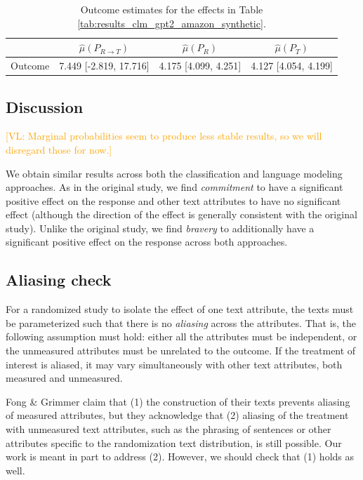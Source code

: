 \documentclass{article}
\newcommand{\vl}[1]{\textcolor{orange}{[VL: #1]}}
\begin{document}
\begin{table}[!ht]
\centering
\begin{tabular}{c|ccc}
\toprule
    & $\hat{\mu}(P_{R \rightarrow T})$   & $\hat{\mu}(P_R)$     & $\hat{\mu}(P_T)$     \\
\midrule
    Outcome & 7.449 [-2.819, 17.716]             & 4.175 [4.099, 4.251] & 4.127 [4.054, 4.199] \\
\bottomrule
\end{tabular}
\caption{Outcome estimates for the effects in Table \ref{tab:results_clm_gpt2_amazon_synthetic}.}
\label{tab:results_clm_gpt2_amazon_synthetic_outcome}
\end{table}

\newpage
\subsection{Discussion}

\vl{Marginal probabilities seem to produce less stable results, so we will disregard those for now.}

We obtain similar results across both the classification and language modeling approaches.  As in the original study, we find \textit{commitment} to have a significant positive effect on the response and other text attributes to have no significant effect (although the direction of the effect is generally consistent with the original study). Unlike the original study, we find \textit{bravery} to additionally have a significant positive effect on the response across both approaches.

\subsection{Aliasing check}

For a randomized study to isolate the effect of one text attribute, the texts must be parameterized such that there is no \textit{aliasing} across the attributes. That is, the following assumption must hold: either all the attributes must be independent, or the unmeasured attributes must be unrelated to the outcome. If the treatment of interest is aliased, it may vary simultaneously with other text attributes, both measured and unmeasured.

Fong \& Grimmer claim that (1) the construction of their texts prevents aliasing of measured attributes, but they acknowledge that (2) aliasing of the treatment with unmeasured text attributes, such as the phrasing of sentences or other attributes specific to the randomization text distribution, is still possible. Our work is meant in part to address (2). However, we should check that (1) holds as well. 
\end{document}
